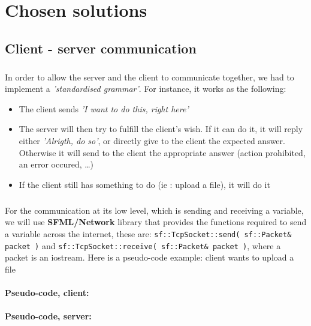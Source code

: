 \documentclass[12pt,a4paper,twoside]{article}
\begin{document}
	\section{Chosen solutions} %
		\subsection{Client - server communication} %
			\subparagraph*{}
				In order to allow the server and the client to communicate together, we had to implement a \textit{'standardised grammar'}. For instance, it works as the following:
				\begin{itemize}
					\item{} The client sends \textit{'I want to do this, right here'}
					\item{} The server will then try to fulfill the client's wish. If it can do it, it will reply either \textit{'Alrigth, do so'}, or directly give to the client the expected answer. Otherwise it will send to the client the appropriate answer (action prohibited, an error occured, \ldots{})
					\item{} If the client still has something to do (ie : upload a file), it will do it
				\end{itemize}
			\subparagraph*{}
				For the communication at its low level, which is sending and receiving a variable, we will use \textbf{SFML/Network} library that provides the functions required to send a variable across the internet, these are: \lstinline$sf::TcpSocket::send( sf::Packet& packet )$ and \lstinline$sf::TcpSocket::receive( sf::Packet& packet )$, where a packet is an iostream.
				Here is a pseudo-code example: client wants to upload a file
			\paragraph*{Pseudo-code, client:}
				
			\paragraph*{Pseudo-code, server:}
				
				
\end{document}
